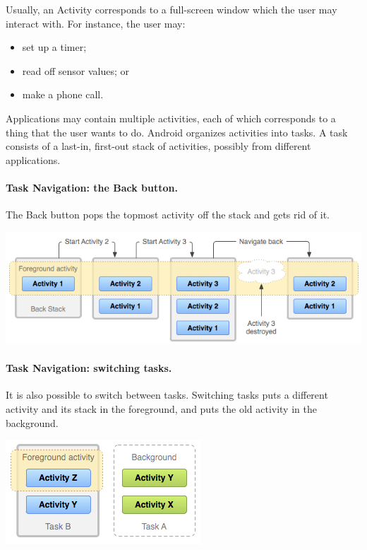 Usually, an Activity corresponds to a full-screen window which 
the user may interact with. For instance, the user may:
\begin{itemize}
\item set up a timer; 
\item read off sensor values; or
\item make a phone call.
\end{itemize}

Applications may contain multiple activities, each of which
corresponds to a thing that the user wants to do.  Android organizes
activities into tasks.  A task consists of a last-in, first-out stack
of activities, possibly from different applications.

\paragraph{Task Navigation: the Back button.}
The Back button pops the topmost activity off the stack and
gets rid of it.

\includegraphics[width=\textwidth]{images/diagram_backstack}\cite{android:backstack}

\paragraph{Task Navigation: switching tasks.} 
It is also possible to switch between tasks.
Switching tasks puts a different activity and its stack
in the foreground, and puts the old activity in the background.

\begin{center}
\includegraphics[width=.5\textwidth]{images/diagram_multitasking}\cite{android:multitasking}
\end{center}


